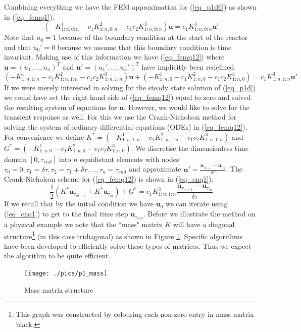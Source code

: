\documentclass[11pt,fleqn]{article}
\theoremstyle{defstyle}
\begin{document}
Combining everything we have the FEM approximation for (\ref{eq_p1d6}) as shown in (\ref{eq_femq1}). 
\begin{equation}
\left(-K^1_{1:n,0:n}-c_1K^2_{1:n,0:n}-c_1c_2K^3_{1:n,0:n} \right)\mathbf{u} =  c_1K^3_{1:n,0:n}\mathbf{u}\prime
\label{eq_femq1}
\end{equation}
Note that $u_0=1$ because of the boundary condition at the start of the reactor and that $u_0\prime=0$ because we assume that this boundary condition is time invariant. Making use of this information we have (\ref{eq_femq12}) where $\mathbf{u}=\left(u_1,...,u_n\right)^T$ and $\mathbf{u}\prime=\left(u_1\prime,...,u_n\prime \right)^T$ have implicitly been redefined.
\begin{equation}
\left(-K^1_{1:n,1:n}-c_1K^2_{1:n,1:n}-c_1c_2K^3_{1:n,1:n} \right)\mathbf{u} +\left(-K^1_{1:n,0}-c_1K^2_{1:n,0} -c_1c_2K^3_{1:n,0}\right) =  c_1K^3_{1:n,1:n}\mathbf{u}\prime
\label{eq_femq12}
\end{equation}
If we were merely interested in solving for the steady state solution of (\ref{eq_p1d}) we could have set the right hand side of (\ref{eq_femq12}) equal to zero and solved the resulting system of equations for $\mathbf{u}$. However, we would like to solve for the transient response as well. For this we use the Crank-Nicholson method for solving the system of ordinary differential equations (ODEs) in (\ref{eq_femq12}). For convenience we define $K^* = \left(-K^1_{1:n,1:n}-c_1K^2_{1:n,1:n}-c_1c_2K^3_{1:n,1:n} \right)$ and $G^{*} = \left(-K^1_{1:n,0}-c_1K^2_{1:n,0} -c_1c_2K^3_{1:n,0}\right)$. We discretise the dimensionless time domain $[0,\tau_{end}]$ into $n$ equidistant elements with nodes $\tau_0 = 0, \tau_1=\delta \tau, \tau_2=\tau_1 + \delta \tau,...,\tau_n=\tau_{end}$ and approximate $\mathbf{u}\prime = \frac{\mathbf{u}_{\tau_{m+1}} -\mathbf{u}_{\tau_m}}{\delta \tau}$. The Crank-Nicholson scheme for (\ref{eq_femq12}) is shown in (\ref{eq_cnq1}).
\begin{equation}
\frac{1}{2}\left( K^*\mathbf{u}_{\tau_{m+1}} + K^*\mathbf{u}_{\tau_m} \right) + G^* = c_1K^3_{1:n,1:n}\frac{\mathbf{u}_{\tau_{m+1}} -\mathbf{u}_{\tau_{m}}}{\delta \tau}
\label{eq_cnq1}
\end{equation} 
If we recall that by the initial condition we have $\mathbf{u}_0$ we can iterate using (\ref{eq_cnq1}) to get to the final time step $\mathbf{u}_{\tau_{end}}$. Before we illustrate the method on a physical example we note that the ``mass" matrix $K$ will have a diagonal structure\footnote{This graph was constructed by colouring each non-zero entry in mass matrix black.} (in this case tridiagonal) as shown in Figure \ref{fig_p1mass}. Specific algorithms have been developed to efficiently solve these types of matrices. Thus we expect the algorithm to be quite efficient. 
\begin{figure}[H] 
\centering
\texttt{[image: ./pics/p1\_mass]}
\caption{Mass matrix structure} 
\label{fig_p1mass}
\end{figure}
\end{document}
